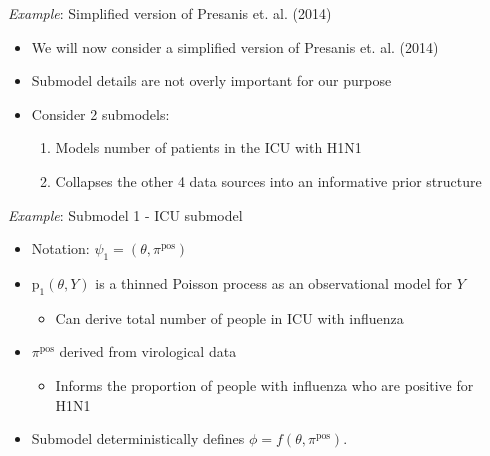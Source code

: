 \documentclass[10pt,ignorenonframetext,]{beamer}
\providecommand{\tightlist}{%
  \setlength{\itemsep}{0pt}\setlength{\parskip}{0pt}}
\newcommand{\pd}{\text{p}}
\begin{document}
\begin{frame}{\emph{Example}: Simplified version of Presanis et. al.
(2014)}

\begin{itemize}
\tightlist
\item
  We will now consider a simplified version of Presanis et. al. (2014)
\item
  Submodel details are not overly important for our purpose
\item
  Consider 2 submodels:

  \begin{enumerate}
  \def\labelenumi{\arabic{enumi}.}
  \tightlist
  \item
    Models number of patients in the ICU with H1N1
  \item
    Collapses the other 4 data sources into an informative prior
    structure
  \end{enumerate}
\end{itemize}

\end{frame}

\begin{frame}{\emph{Example}: Submodel 1 - ICU submodel}



\begin{itemize}
\tightlist
\item
  Notation: \(\psi_{1} = (\theta, \pi^{\text{pos}})\)
\item
  \(\pd_{1}(\theta, Y)\) is a thinned Poisson process as an
  observational model for \(Y\)

  \begin{itemize}
  \tightlist
  \item
    Can derive total number of people in ICU with influenza
  \end{itemize}
\item
  \(\pi^{\text{pos}}\) derived from virological data

  \begin{itemize}
  \tightlist
  \item
    Informs the proportion of people with influenza who are positive for
    H1N1
  \end{itemize}
\item
  Submodel deterministically defines
  \(\phi = f(\theta, \pi^{\text{pos}})\).
\end{itemize}

\end{frame}
\end{document}
